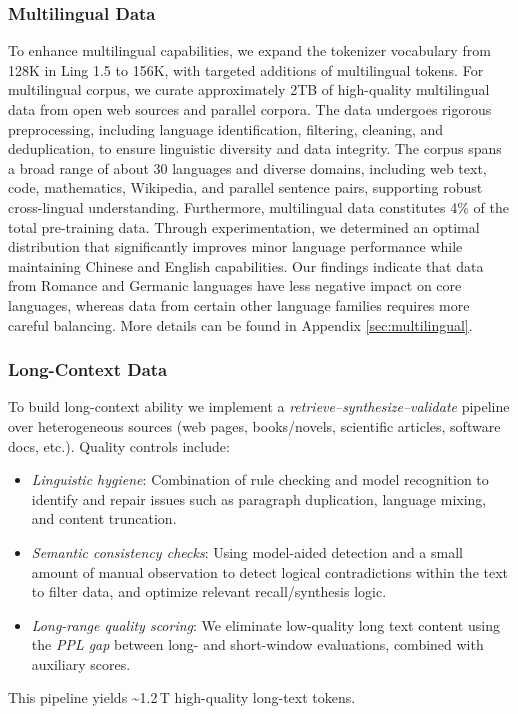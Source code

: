 \documentclass[table]{gtech}
\theoremstyle{definition}
\begin{document}
\subsubsection{Multilingual Data}

To enhance multilingual capabilities, we expand the tokenizer vocabulary from 128K in Ling 1.5 to 156K, with targeted additions of multilingual tokens. For multilingual corpus, we curate approximately 2TB of high-quality multilingual data from open web sources and parallel corpora. The data undergoes rigorous preprocessing, including language identification, filtering, cleaning, and deduplication, to ensure linguistic diversity and data integrity. The corpus spans a broad range of about 30 languages and diverse domains, including web text, code, mathematics, Wikipedia, and parallel sentence pairs, supporting robust cross-lingual understanding. Furthermore, multilingual data constitutes 4\% of the total pre-training data. Through experimentation, we determined an optimal distribution that significantly improves minor language performance while maintaining Chinese and English capabilities. Our findings indicate that data from Romance and Germanic languages have less negative impact on core languages, whereas data from certain other language families requires more careful balancing. More details can be found in Appendix \ref{sec:multilingual}.

\subsubsection{Long-Context Data} 
To build long-context ability we implement a \emph{retrieve–synthesize–validate} pipeline over heterogeneous sources (web pages, books/novels, scientific articles, software docs, etc.). Quality controls include: 
\begin{itemize}
    \item \emph{Linguistic hygiene}: Combination of rule checking and model recognition to identify and repair issues such as paragraph duplication, language mixing, and content truncation.
    \item \emph{Semantic consistency checks}: Using model-aided detection and a small amount of manual observation to detect logical contradictions within the text to filter data, and optimize relevant recall/synthesis logic.
    \item \emph{Long-range quality scoring}: We eliminate low-quality long text content using the \emph{PPL gap} between long- and short-window evaluations, combined with auxiliary scores. 
\end{itemize}
This pipeline yields \textasciitilde1.2\,\textsc{T} high-quality long-text tokens.
\end{document}
